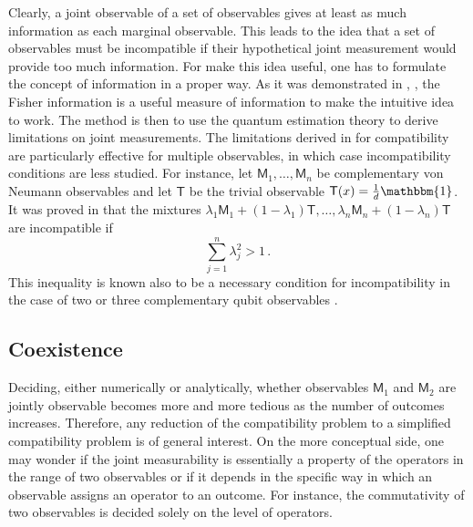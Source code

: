 \documentclass[12pt]{article}
\theoremstyle{definition}
\newcommand{\id}{\mathbbm{1}} %
\newcommand{\Mo}{\mathsf{M}}%
\newcommand{\To}{\mathsf{T}}%
\begin{document}
Clearly, a joint observable of a set of observables gives at least as much information as each marginal observable. 
This leads to the idea that a set of observables must be incompatible if their hypothetical joint measurement would provide too much information. 
For make this idea useful, one has to formulate the concept of information in a proper way. 
As it was demonstrated in \cite{WaSaUe11}, \cite{Zhu15}, the Fisher information is a useful measure of information to make the intuitive idea to work. 
The method is then to use the quantum estimation theory to derive limitations on joint measurements.
 The limitations derived in \cite{Zhu15} for compatibility are particularly effective for multiple observables, in which case incompatibility conditions are less studied. For instance, let $\Mo_1, \ldots,\Mo_n$ be complementary von Neumann observables and let $\To$ be the trivial observable $\To(x)=\frac{1}{d} \id$.  It was proved in \cite{Zhu15} that the mixtures $\lambda_1 \Mo_1 + (1-\lambda_1) \To,\ldots,\lambda_n \Mo_n + (1-\lambda_n) \To$ are incompatible if
\begin{equation}
\sum_{j=1}^n \lambda_j^2  > 1 \, .
\end{equation}
This inequality is known also to be a necessary condition for incompatibility in the case of two or three complementary qubit observables \cite{Busch86}. 


\subsection{Coexistence}

Deciding, either numerically or analytically,  
whether observables $\Mo_1$ and $\Mo_2$ are
jointly observable becomes more and more tedious as the number of 
outcomes increases. Therefore, any reduction of the
compatibility problem to a simplified compatibility problem 
is of general interest. 
On the more conceptual side, one may wonder if the joint measurability is essentially a property of the operators in the range of two observables or if it depends in the specific way in which an observable assigns an operator to an outcome. For instance, the commutativity of two observables is decided solely on the level of operators. 
\end{document}
